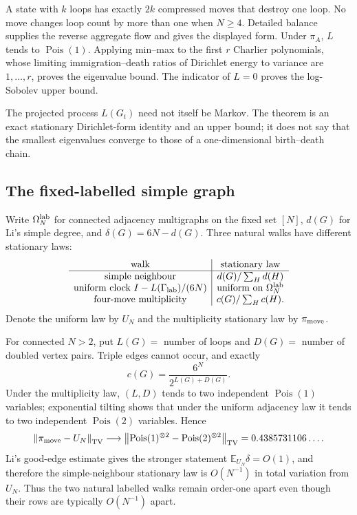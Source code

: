 \documentclass[11pt]{article}
\makeatletter
\newcommand{\E}{\mathbb E}
\newcommand{\norm}[1]{\left\|#1\right\|}
\theoremstyle{definition}
\renewenvironment{proof}[1][\proofname]{\par
  \pushQED{\qed}%
  \normalfont \topsep6\p@\@plus6\p@\relax
  \trivlist
  \item[\hskip\labelsep\bfseries #1\@addpunct{.}]\ignorespaces
}{%
  \popQED\endtrivlist\@endpefalse
}
\makeatother
\begin{document}
\begin{proof}
A state with $k$ loops has exactly $2k$ compressed moves that destroy one
loop.  No move changes loop count by more than one when $N\ge4$.  Detailed
balance supplies the reverse aggregate flow and gives the displayed form.
Under $\pi_A$, $L$ tends to $\operatorname{Pois}(1)$.  Applying min--max to
the first $r$ Charlier polynomials, whose limiting immigration--death
ratios of Dirichlet energy to variance are $1,\ldots,r$, proves the eigenvalue bound.  The
indicator of $L=0$ proves the log-Sobolev upper bound.
\end{proof}

The projected process $L(G_t)$ need not itself be Markov.  The theorem is an
exact stationary Dirichlet-form identity and an upper bound; it does not say
that the smallest eigenvalues converge to those of a one-dimensional
birth--death chain.

\subsection{The fixed-labelled simple graph}

Write $\Omega_N^{\rm lab}$ for connected adjacency multigraphs on the fixed
set $[N]$, $d(G)$ for Li's simple degree, and $\delta(G)=6N-d(G)$.  Three
natural walks have different stationary laws:
\[
 \begin{array}{c|c}
 \text{walk}&\text{stationary law}\\ \hline
 \text{simple neighbour}&d(G)/\sum_Hd(H)\\
 \text{uniform clock }I-L(\Gamma_{\rm lab})/(6N)&\text{uniform on }\Omega_N^{\rm lab}\\
 \text{four-move multiplicity}&c(G)/\sum_Hc(H).
 \end{array}
\]
Denote the uniform law by $U_N$ and the multiplicity stationary law by
$\pi_{\rm move}$.

For connected $N>2$, put $L(G)=$ number of loops and $D(G)=$ number of
doubled vertex pairs.  Triple edges cannot occur, and exactly
\[
    c(G)=\frac{6^N}{2^{L(G)+D(G)}}.
\]
Under the multiplicity law, $(L,D)$ tends to two independent
$\operatorname{Pois}(1)$ variables; exponential tilting shows that under the
uniform adjacency law it tends to two independent
$\operatorname{Pois}(2)$ variables.  Hence
\[
 \norm{\pi_{\rm move}-U_N}_{\rm TV}
 \longrightarrow
 \norm{\operatorname{Pois}(1)^{\otimes2}
       -\operatorname{Pois}(2)^{\otimes2}}_{\rm TV}
 =0.4385731106\ldots.
\]
Li's good-edge estimate gives the stronger statement
$\E_{U_N}\delta=O(1)$, and therefore the simple-neighbour stationary law is
$O(N^{-1})$ in total variation from $U_N$.  Thus the two natural labelled
walks remain order-one apart even though their rows are typically
$O(N^{-1})$ apart.
\end{document}
